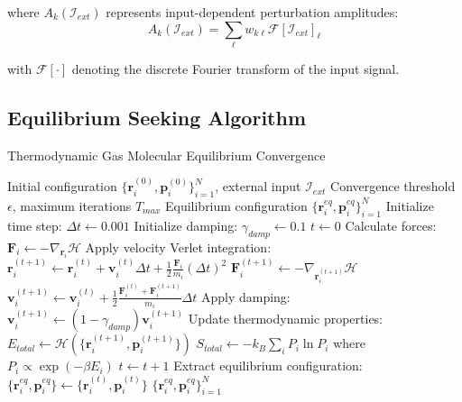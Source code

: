 \documentclass[11pt,a4paper]{article}
\begin{document}
where $A_k(\mathcal{I}_{ext})$ represents input-dependent perturbation amplitudes:
\begin{equation}
A_k(\mathcal{I}_{ext}) = \sum_{\ell} w_{k\ell} \mathcal{F}[\mathcal{I}_{ext}]_\ell
\label{eq:perturbation-amplitude}
\end{equation}

with $\mathcal{F}[\cdot]$ denoting the discrete Fourier transform of the input signal.

\subsection{Equilibrium Seeking Algorithm}

\begin{algorithm}
\caption{Thermodynamic Gas Molecular Equilibrium Convergence}
\label{alg:equilibrium-seeking}
\begin{algorithmic}[1]
\REQUIRE Initial configuration $\{\mathbf{r}_i^{(0)}, \mathbf{p}_i^{(0)}\}_{i=1}^N$, external input $\mathcal{I}_{ext}$
\REQUIRE Convergence threshold $\epsilon$, maximum iterations $T_{max}$
\ENSURE Equilibrium configuration $\{\mathbf{r}_i^{eq}, \mathbf{p}_i^{eq}\}_{i=1}^N$
\STATE Initialize time step: $\Delta t \leftarrow 0.001$
\STATE Initialize damping: $\gamma_{damp} \leftarrow 0.1$
\STATE $t \leftarrow 0$
        \STATE Calculate forces: $\mathbf{F}_i \leftarrow -\nabla_{\mathbf{r}_i} \mathcal{H}$
        \STATE Apply velocity Verlet integration:
        \STATE $\mathbf{r}_i^{(t+1)} \leftarrow \mathbf{r}_i^{(t)} + \mathbf{v}_i^{(t)} \Delta t + \frac{1}{2} \frac{\mathbf{F}_i}{m_i} (\Delta t)^2$
        \STATE $\mathbf{F}_i^{(t+1)} \leftarrow -\nabla_{\mathbf{r}_i^{(t+1)}} \mathcal{H}$
        \STATE $\mathbf{v}_i^{(t+1)} \leftarrow \mathbf{v}_i^{(t)} + \frac{1}{2} \frac{\mathbf{F}_i^{(t)} + \mathbf{F}_i^{(t+1)}}{m_i} \Delta t$
        \STATE Apply damping: $\mathbf{v}_i^{(t+1)} \leftarrow (1 - \gamma_{damp}) \mathbf{v}_i^{(t+1)}$
    \ENDFOR
    \STATE Update thermodynamic properties:
    \STATE $E_{total} \leftarrow \mathcal{H}(\{\mathbf{r}_i^{(t+1)}, \mathbf{p}_i^{(t+1)}\})$
    \STATE $S_{total} \leftarrow -k_B \sum_i P_i \ln P_i$ where $P_i \propto \exp(-\beta E_i)$
    \STATE $t \leftarrow t + 1$
\ENDWHILE
\STATE Extract equilibrium configuration: $\{\mathbf{r}_i^{eq}, \mathbf{p}_i^{eq}\} \leftarrow \{\mathbf{r}_i^{(t)}, \mathbf{p}_i^{(t)}\}$
\RETURN $\{\mathbf{r}_i^{eq}, \mathbf{p}_i^{eq}\}_{i=1}^N$
\end{algorithmic}
\end{algorithm}
\end{document}
